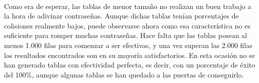 \documentclass[12pt,spanish,listoffigures,listoftables]{tfgetsinf}
\begin{document}
\def\arraystretch{1.5}
\begin{table}[ht]
	\centering
	\caption{Porcentajes de éxito para las tablas que emplean \textbf{R1}}
	\label{exR1}
\end{table}
~\\

Como era de esperar, las tablas de menor tamaño no realizan un buen trabajo a la hora de adivinar contraseñas. Aunque dichas tablas tenían porcentajes de colisiones realmente bajos, puede observarse ahora como esa característica no es suficiente para romper muchas contraseñas. Hace falta que las tablas posean al menos 1.000 filas para comenzar a ser efectivas, y una vez superan las 2.000 filas los resultados encontrados son en su mayoría satisfactorios. En esta ocasión no se han generado tablas con efectividad perfecta, es decir, con un porcentaje de éxito del 100\%, aunque algunas tablas se han quedado a las puertas de conseguirlo.
\end{document}
